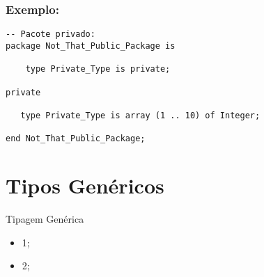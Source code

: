 \documentclass{beamer}
\begin{document}
    \begin{frame}[containsverbatim]
    
        \frametitle{Exemplo:}
\begin{verbatim}
-- Pacote privado:
package Not_That_Public_Package is

    type Private_Type is private;

private

   type Private_Type is array (1 .. 10) of Integer;

end Not_That_Public_Package;
\end{verbatim}
    \end{frame}

    \section{Tipos Genéricos}
    \begin{frame}{Tipagem Genérica}
        \begin{itemize}
            \item<1-> 1;
            \item<2-> 2;
        \end{itemize}
    \end{frame}
\end{document}
